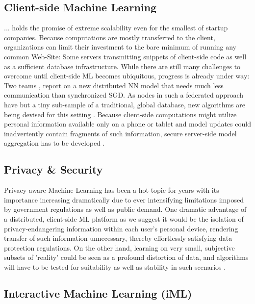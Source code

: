 \documentclass{llncs}
\begin{document}
\subsection{Client-side Machine Learning}
\label{ssect:cs_ML}

... holds the promise of extreme scalability even for the smallest of startup companies. Because computations are mostly transferred to the client, organizations can limit their investment to the bare minimum of running any common Web-Site: Some servers transmitting snippets of client-side code as well as a sufficient database infrastructure. While there are still many challenges to overcome until client-side ML becomes ubiquitous, progress is already under way: Two teams \cite{mcmahan2016communication}, \cite{konevcny2016federatedlearning} report on a new distributed NN model that needs much less communication than synchronized SGD. As nodes in such a federated approach have but a tiny sub-sample of a traditional, global database, new algorithms are being devised for this setting \cite{konevcny2016federatedoptimization}. Because client-side computations might utilize personal information available only on a phone or tablet and model updates could inadvertently contain fragments of such information, secure server-side model aggregation has to be developed \cite{2017secureaggregation}.


\subsection{Privacy \& Security}
\label{ssect:privacy_security}

Privacy aware Machine Learning has been a hot topic for years \cite{wainwright2012paml} with its importance increasing dramatically due to ever intensifying limitations imposed by government regulations as well as public demand. One dramatic advantage of a distributed, client-side ML platform as we suggest it would be the isolation of privacy-endangering information within each user's personal device, rendering transfer of such information unnecessary, thereby effortlessly satisfying data protection regulations. On the other hand, learning on very small, subjective subsets of 'reality' could be seen as a profound distortion of data, and algorithms will have to be tested for suitability as well as stability in such scenarios \cite{malle2016right}.

\subsection{Interactive Machine Learning (iML)}
\label{ssect:iML}
\end{document}
